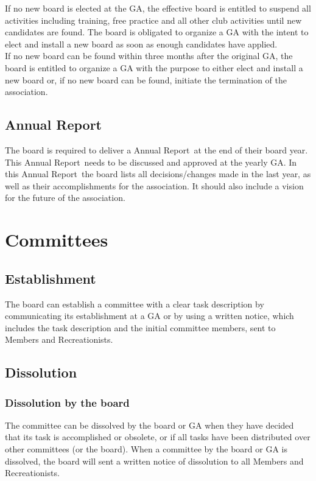 \documentclass[a4paper]{article}
\newcommand{\Ajv}{Annual Report} %
\begin{document}
If no new board is elected at the GA, the effective board is entitled to suspend all activities including training, free practice and all other club activities until new candidates are found. The board is obligated to organize a GA with the intent to elect and install a new board as soon as enough candidates have applied. \\

If no new board can be found within three months after the original GA, the board is entitled to organize a GA with the purpose to either elect and install a new board or, if no new board can be found, initiate the termination of the association.

\subsection{\Ajv}
The board is required to deliver a \Ajv\ at the end of their board year. This \Ajv\ needs to be discussed and approved at the yearly GA. In this \Ajv\ the board lists all decisions/changes made in the last year, as well as their accomplishments for the association. It should also include a vision for the future of the association.

\pagebreak

\section{Committees}
\subsection{Establishment}
The board can establish a committee with a clear task description by communicating its establishment at a GA or by using a written notice, which includes the task description and the initial committee members, sent to Members and Recreationists.

\subsection{Dissolution}
\subsubsection{Dissolution by the board}
The committee can be dissolved by the board or GA when they have decided that its task is accomplished or obsolete, or if all tasks have been distributed over other committees (or the board). When a committee by the board or GA is dissolved, the board will sent a written notice of dissolution to all Members and Recreationists.
\end{document}
